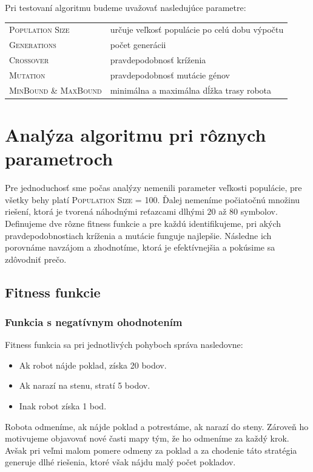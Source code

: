 \documentclass[10pt]{paper}
\begin{document}
Pri testovaní algoritmu budeme uvažovať nasledujúce parametre:

\begin{tabular}{ll}
\hline
\textsc{Population Size} & určuje veľkosť populácie po celú dobu výpočtu \\ 
\textsc{Generations} & počet generácii \\
\textsc{Crossover}  & pravdepodobnosť kríženia  \\
\textsc{Mutation}  &  pravdepodobnosť mutácie génov  \\
\textsc{MinBound \& MaxBound}  &  minimálna a maximálna dĺžka trasy robota \\ \hline
\end{tabular}

\section{Analýza algoritmu pri rôznych parametroch}

Pre jednoduchosť sme počas analýzy nemenili parameter veľkosti populácie, pre všetky behy platí \textsc{Population Size} = 100. Ďalej nemeníme počiatočnú množinu riešení, ktorá je tvorená náhodnými reťazcami dlhými $20$ až $80$ symbolov. Definujeme dve rôzne fitness funkcie a pre každú identifikujeme, pri akých pravdepodobnostiach kríženia a mutácie funguje najlepšie. Následne ich porovnáme navzájom a zhodnotíme, ktorá je efektívnejšia a pokúsime sa zdôvodniť prečo.

\subsection{Fitness funkcie}
\subsubsection{Funkcia s negatívnym ohodnotením}
Fitness funkcia sa pri jednotlivých pohyboch správa nasledovne:
\begin{itemize}[noitemsep]
\item Ak robot nájde poklad, získa 20 bodov.
\item Ak narazí na stenu, stratí 5 bodov.
\item Inak robot získa 1 bod.
\end{itemize}
Robota odmeníme, ak nájde poklad a potrestáme, ak narazí do steny. Zároveň ho motivujeme objavovať nové časti mapy tým, že ho odmeníme za každý krok. Avšak pri veľmi malom pomere odmeny za poklad a za chodenie táto stratégia generuje dlhé riešenia, ktoré však nájdu malý počet pokladov.
\end{document}
